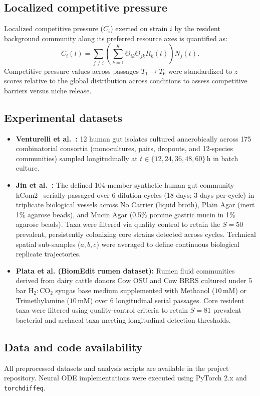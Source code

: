 \subsection*{Localized competitive pressure}
Localized competitive pressure ($C_i$) exerted on strain $i$ by the resident background community along its preferred resource axes is quantified as:
\begin{equation}
C_i(t) = \sum_{j \ne i} \left( \sum_{k=1}^K \Theta_{ik} \Theta_{jk} R_k(t) \right) N_j(t).
\label{eq:methods_competitive_pressure}
\end{equation}
Competitive pressure values across passages $T_1 \to T_6$ were standardized to $z$-scores relative to the global distribution across conditions to assess competitive barriers versus niche release.

\subsection*{Experimental datasets}
\begin{itemize}
    \item \textbf{Venturelli et al.~\cite{venturelli2018deciphering}:} 12 human gut isolates cultured anaerobically across 175 combinatorial consortia (monocultures, pairs, dropouts, and 12-species communities) sampled longitudinally at $t \in \{12, 24, 36, 48, 60\}$\,h in batch culture.
    \item \textbf{Jin et al.~\cite{jin2023culturing}:} The defined 104-member synthetic human gut community hCom2~\cite{cheng2022design,jin2023culturing} serially passaged over 6 dilution cycles (18 days; 3 days per cycle) in triplicate biological vessels across No Carrier (liquid broth), Plain Agar (inert 1\% agarose beads), and Mucin Agar (0.5\% porcine gastric mucin in 1\% agarose beads). Taxa were filtered via quality control to retain the $S=50$ prevalent, persistently colonizing core strains detected across cycles. Technical spatial sub-samples ($a, b, c$) were averaged to define continuous biological replicate trajectories.
    \item \textbf{Plata et al. (BiomEdit rumen dataset):} Rumen fluid communities derived from dairy cattle donors Cow OSU and Cow BRRS cultured under 5 bar $\mathrm{H_2:CO_2}$ syngas base medium supplemented with Methanol ($10\,\text{mM}$) or Trimethylamine ($10\,\text{mM}$) over 6 longitudinal serial passages. Core resident taxa were filtered using quality-control criteria to retain $S=81$ prevalent bacterial and archaeal taxa meeting longitudinal detection thresholds.
\end{itemize}

\subsection*{Data and code availability}
All preprocessed datasets and analysis scripts are available in the project repository. Neural ODE implementations were executed using PyTorch 2.x and \texttt{torchdiffeq}.
